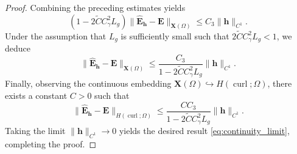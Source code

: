 \documentclass[12pt,reqno]{amsart}
\theoremstyle{definition}
\numberwithin{equation}{section}
\begin{document}
\begin{proof}
Combining the preceding estimates yields
\[
\left( 1 - 2\widetilde{C} C_\gamma^2 L_g \right) \|\hat{\mathbf{E}}_{\mathbf{h}} - \mathbf{E}\|_{\mathbf{X}(\Omega)} \le C_3 \|\mathbf{h}\|_{C^1}.
\]
Under the assumption that $L_g$ is sufficiently small such that $2\widetilde{C} C_\gamma^2 L_g < 1$, we deduce
\[
\|\hat{\mathbf{E}}_{\mathbf{h}} - \mathbf{E}\|_{\mathbf{X}(\Omega)} \le \frac{C_3}{1 - 2\widetilde{C} C_\gamma^2 L_g} \|\mathbf{h}\|_{C^1}.
\]
Finally, observing the continuous embedding $\mathbf{X}(\Omega) \hookrightarrow H(\operatorname{curl}; \Omega)$, there exists a constant $C > 0$ such that
\[
\|\hat{\mathbf{E}}_{\mathbf{h}} - \mathbf{E}\|_{H(\operatorname{curl}; \Omega)} \le \frac{C C_3}{1 - 2\widetilde{C} C_\gamma^2 L_g} \|\mathbf{h}\|_{C^1}.
\]
Taking the limit $\|\mathbf{h}\|_{C^1} \to 0$ yields the desired result \eqref{eq:continuity_limit}, completing the proof.




\end{proof}
\end{document}
